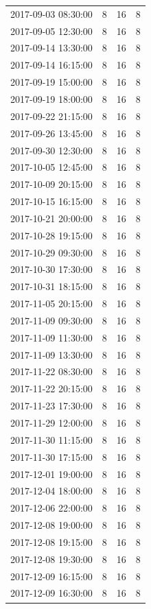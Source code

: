 \begin{tabular}{lrrr}
2017-09-03 08:30:00 & 8 & 16 & 8 \\
2017-09-05 12:30:00 & 8 & 16 & 8 \\
2017-09-14 13:30:00 & 8 & 16 & 8 \\
2017-09-14 16:15:00 & 8 & 16 & 8 \\
2017-09-19 15:00:00 & 8 & 16 & 8 \\
2017-09-19 18:00:00 & 8 & 16 & 8 \\
2017-09-22 21:15:00 & 8 & 16 & 8 \\
2017-09-26 13:45:00 & 8 & 16 & 8 \\
2017-09-30 12:30:00 & 8 & 16 & 8 \\
2017-10-05 12:45:00 & 8 & 16 & 8 \\
2017-10-09 20:15:00 & 8 & 16 & 8 \\
2017-10-15 16:15:00 & 8 & 16 & 8 \\
2017-10-21 20:00:00 & 8 & 16 & 8 \\
2017-10-28 19:15:00 & 8 & 16 & 8 \\
2017-10-29 09:30:00 & 8 & 16 & 8 \\
2017-10-30 17:30:00 & 8 & 16 & 8 \\
2017-10-31 18:15:00 & 8 & 16 & 8 \\
2017-11-05 20:15:00 & 8 & 16 & 8 \\
2017-11-09 09:30:00 & 8 & 16 & 8 \\
2017-11-09 11:30:00 & 8 & 16 & 8 \\
2017-11-09 13:30:00 & 8 & 16 & 8 \\
2017-11-22 08:30:00 & 8 & 16 & 8 \\
2017-11-22 20:15:00 & 8 & 16 & 8 \\
2017-11-23 17:30:00 & 8 & 16 & 8 \\
2017-11-29 12:00:00 & 8 & 16 & 8 \\
2017-11-30 11:15:00 & 8 & 16 & 8 \\
2017-11-30 17:15:00 & 8 & 16 & 8 \\
2017-12-01 19:00:00 & 8 & 16 & 8 \\
2017-12-04 18:00:00 & 8 & 16 & 8 \\
2017-12-06 22:00:00 & 8 & 16 & 8 \\
2017-12-08 19:00:00 & 8 & 16 & 8 \\
2017-12-08 19:15:00 & 8 & 16 & 8 \\
2017-12-08 19:30:00 & 8 & 16 & 8 \\
2017-12-09 16:15:00 & 8 & 16 & 8 \\
2017-12-09 16:30:00 & 8 & 16 & 8 \\

\end{tabular}
